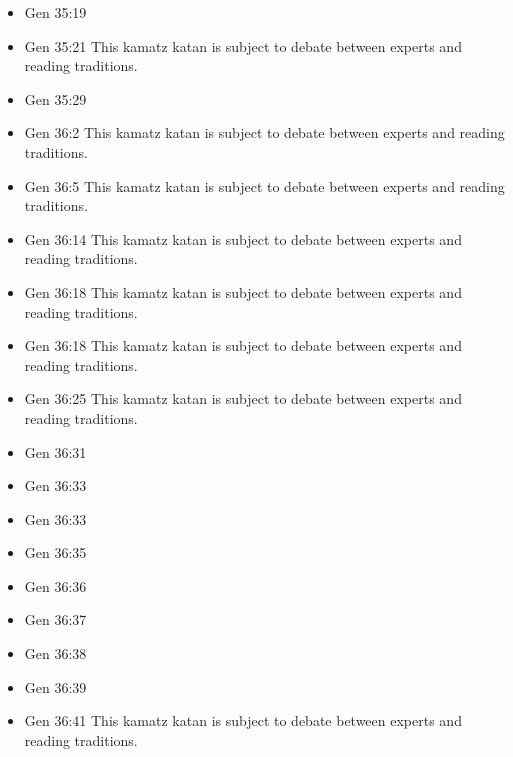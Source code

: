 \documentclass[14pt]{article}
\begin{document}
\begin{multicols}{2}
\begin{itemize}
\item Gen 35:19

\item Gen 35:21 This kamatz katan is subject to debate between experts and reading traditions.

\item Gen 35:29

\item Gen 36:2 This kamatz katan is subject to debate between experts and reading traditions.

\item Gen 36:5 This kamatz katan is subject to debate between experts and reading traditions.

\item Gen 36:14 This kamatz katan is subject to debate between experts and reading traditions.

\item Gen 36:18 This kamatz katan is subject to debate between experts and reading traditions.

\item Gen 36:18 This kamatz katan is subject to debate between experts and reading traditions.

\item Gen 36:25 This kamatz katan is subject to debate between experts and reading traditions.

\item Gen 36:31

\item Gen 36:33

\item Gen 36:33

\item Gen 36:35

\item Gen 36:36

\item Gen 36:37

\item Gen 36:38

\item Gen 36:39

\item Gen 36:41 This kamatz katan is subject to debate between experts and reading traditions.


\end{itemize}
\end{multicols}
\end{document}
